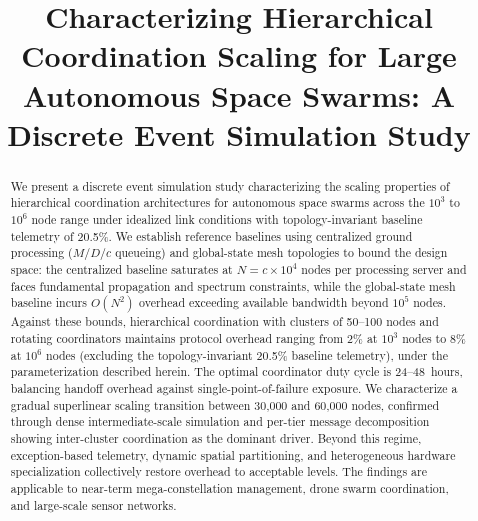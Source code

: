 \documentclass[journal]{IEEEtran}
\begin{document}
\title{Characterizing Hierarchical Coordination Scaling for Large Autonomous Space Swarms: A Discrete Event Simulation Study}

\author{
}


\maketitle

\begin{abstract}
We present a discrete event simulation study characterizing the scaling properties of hierarchical coordination architectures for autonomous space swarms across the $10^3$ to $10^6$ node range under idealized link conditions with topology-invariant baseline telemetry of 20.5\%. We establish reference baselines using centralized ground processing ($M/D/c$ queueing) and global-state mesh topologies to bound the design space: the centralized baseline saturates at $N = c \times 10^4$ nodes per processing server and faces fundamental propagation and spectrum constraints, while the global-state mesh baseline incurs $O(N^2)$ overhead exceeding available bandwidth beyond $10^5$ nodes. Against these bounds, hierarchical coordination with clusters of 50--100 nodes and rotating coordinators maintains protocol overhead ranging from 2\% at $10^3$ nodes to 8\% at $10^6$ nodes (excluding the topology-invariant 20.5\% baseline telemetry), under the parameterization described herein. The optimal coordinator duty cycle is 24--48~hours, balancing handoff overhead against single-point-of-failure exposure. We characterize a gradual superlinear scaling transition between 30{,}000 and 60{,}000 nodes, confirmed through dense intermediate-scale simulation and per-tier message decomposition showing inter-cluster coordination as the dominant driver. Beyond this regime, exception-based telemetry, dynamic spatial partitioning, and heterogeneous hardware specialization collectively restore overhead to acceptable levels. The findings are applicable to near-term mega-constellation management, drone swarm coordination, and large-scale sensor networks.
\end{abstract}
\end{document}
